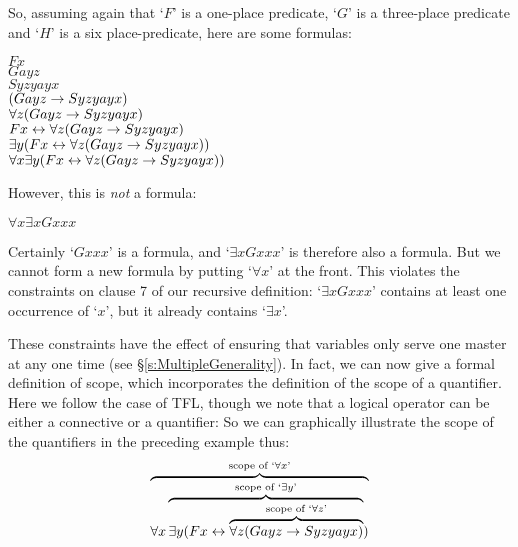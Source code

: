 So, assuming again that `$F$' is a one-place predicate, `$G$' is a three-place predicate and `$H$' is a six place-predicate, here are some formulas:
	\begin{center}
		$Fx$\\
		$Gayz$\\
		$Syzyayx$\\
		$(Gayz \rightarrow Syzyayx)$\\
		$\forall z (Gayz \rightarrow Syzyayx)$\\
		$Fx \leftrightarrow \forall z (Gayz \rightarrow Syzyayx)$\\
		$\exists y (Fx \leftrightarrow \forall z (Gayz \rightarrow Syzyayx))$\\
		$\forall x \exists y (Fx \leftrightarrow \forall z (Gayz \rightarrow Syzyayx))$		\end{center}
However, this is \emph{not} a formula:
	\begin{center}
		$\forall x \exists x Gxxx$
	\end{center}
Certainly `$Gxxx$' is a formula, and `$\exists x Gxxx$' is therefore also a formula. But we cannot form a new formula by putting `$\forall x$' at the front. This violates the constraints on clause 7 of our recursive definition: `$\exists x Gxxx$' contains at least one occurrence of `$x$', but it already contains `$\exists x$'.

These constraints have the effect of ensuring that variables only serve one master at any one time (see \S\ref{s:MultipleGenerality}). In fact, we can now give a formal definition of scope, which incorporates the definition of the scope of a quantifier. Here we follow the case of TFL, though we note that a logical operator can be either a connective or a quantifier:
So we can graphically illustrate the scope of the quantifiers in the preceding example thus:
	$$\overbrace{\forall x \overbrace{\exists y (Fx \leftrightarrow \overbrace{\forall z (Gayz \rightarrow Syzyayx)}^{\text{scope of `}\forall z\text{'}}}^{\text{scope of `}\exists y\text{'}})}^{\text{scope of `$\forall x$'}}$$


